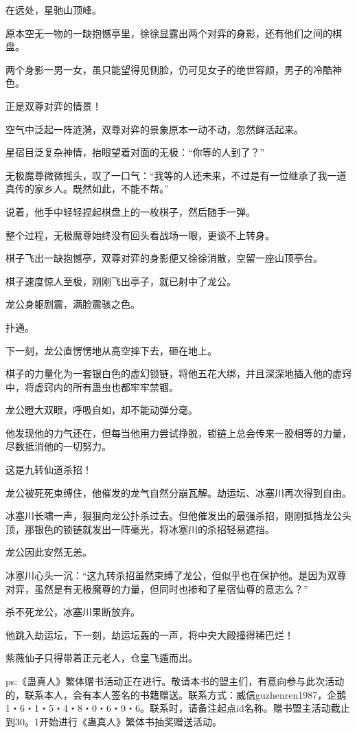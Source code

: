 \begin{this_body}
在远处，星驰山顶峰。

原本空无一物的一缺抱憾亭里，徐徐显露出两个对弈的身影，还有他们之间的棋盘。

两个身影一男一女，虽只能望得见侧脸，仍可见女子的绝世容颜，男子的冷酷神色。

正是双尊对弈的情景！

空气中泛起一阵涟漪，双尊对弈的景象原本一动不动，忽然鲜活起来。

星宿目泛复杂神情，抬眼望着对面的无极：“你等的人到了？”

无极魔尊微微摇头，叹了一口气：“我等的人还未来，不过是有一位继承了我一道真传的家乡人。既然如此，不能不帮。”

说着，他手中轻轻捏起棋盘上的一枚棋子，然后随手一弹。

整个过程，无极魔尊始终没有回头看战场一眼，更谈不上转身。

棋子飞出一缺抱憾亭，双尊对弈的身影便又徐徐消散，空留一座山顶亭台。

棋子速度惊人至极，刚刚飞出亭子，就已射中了龙公。

龙公身躯剧震，满脸震骇之色。

扑通。

下一刻，龙公直愣愣地从高空摔下去，砸在地上。

棋子的力量化为一套银白色的虚幻锁链，将他五花大绑，并且深深地插入他的虚窍中，将虚窍内的所有蛊虫也都牢牢禁锢。

龙公瞪大双眼，呼吸自如，却不能动弹分毫。

他发现他的力气还在，但每当他用力尝试挣脱，锁链上总会传来一股相等的力量，尽数抵消他的一切努力。

这是九转仙道杀招！

龙公被死死束缚住，他催发的龙气自然分崩瓦解。劫运坛、冰塞川再次得到自由。

冰塞川长啸一声，狠狠向龙公扑杀过去。但他催发出的最强杀招，刚刚抵挡龙公头顶，那银色的锁链就发出一阵毫光，将冰塞川的杀招轻易遮挡。

龙公因此安然无恙。

冰塞川心头一沉：“这九转杀招虽然束缚了龙公，但似乎也在保护他。是因为双尊对弈，虽然是有无极魔尊的力量，但同时也掺和了星宿仙尊的意志么？”

杀不死龙公，冰塞川果断放弃。

他跳入劫运坛，下一刻，劫运坛轰的一声，将中央大殿撞得稀巴烂！

紫薇仙子只得带着正元老人，仓皇飞遁而出。

ps:《蛊真人》繁体赠书活动正在进行。敬请本书的盟主们，有意向参与此次活动的，联系本人，会有本人签名的书籍赠送。联系方式：威信guzhenren1987，企鹅1・6・1・5・4・8・0・6・9・6。联系时，请备注起点id名称。赠书盟主活动截止到30。1开始进行《蛊真人》繁体书抽奖赠送活动。

\end{this_body}


